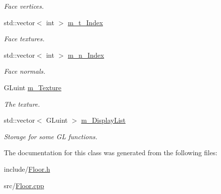 \begin{DoxyCompactItemize}
\begin{DoxyCompactList}\small\item\em Face vertices. \end{DoxyCompactList}\item 
\hypertarget{classFloor_aff774ae7043abd80f29b63454230dbb4}{std\-::vector$<$ int $>$ \hyperlink{classFloor_aff774ae7043abd80f29b63454230dbb4}{m\-\_\-t\-\_\-\-Index}}\label{classFloor_aff774ae7043abd80f29b63454230dbb4}

\begin{DoxyCompactList}\small\item\em Face textures. \end{DoxyCompactList}\item 
\hypertarget{classFloor_a558552ba212e901f3148d76ed7768cfc}{std\-::vector$<$ int $>$ \hyperlink{classFloor_a558552ba212e901f3148d76ed7768cfc}{m\-\_\-n\-\_\-\-Index}}\label{classFloor_a558552ba212e901f3148d76ed7768cfc}

\begin{DoxyCompactList}\small\item\em Face normals. \end{DoxyCompactList}\item 
\hypertarget{classFloor_a2b9b8d456e8f1aa91918224879c2652a}{G\-Luint \hyperlink{classFloor_a2b9b8d456e8f1aa91918224879c2652a}{m\-\_\-\-Texture}}\label{classFloor_a2b9b8d456e8f1aa91918224879c2652a}

\begin{DoxyCompactList}\small\item\em The texture. \end{DoxyCompactList}\item 
\hypertarget{classFloor_a3a852a46362a8375f58a67c023c48833}{std\-::vector$<$ G\-Luint $>$ \hyperlink{classFloor_a3a852a46362a8375f58a67c023c48833}{m\-\_\-\-Display\-List}}\label{classFloor_a3a852a46362a8375f58a67c023c48833}

\begin{DoxyCompactList}\small\item\em Storage for some G\-L functions. \end{DoxyCompactList}\end{DoxyCompactItemize}


The documentation for this class was generated from the following files\-:\begin{DoxyCompactItemize}
\item 
include/\hyperlink{Floor_8h}{Floor.\-h}\item 
src/\hyperlink{Floor_8cpp}{Floor.\-cpp}\end{DoxyCompactItemize}
